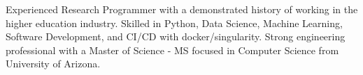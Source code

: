 

\begin{cvparagraph}

Experienced Research Programmer with a demonstrated history of working in the higher education industry. Skilled in Python, Data Science, Machine Learning, Software Development, and CI/CD with docker/singularity. Strong engineering professional with a Master of Science - MS focused in Computer Science from University of Arizona.
\end{cvparagraph}

\vspace{-0.25cm}
